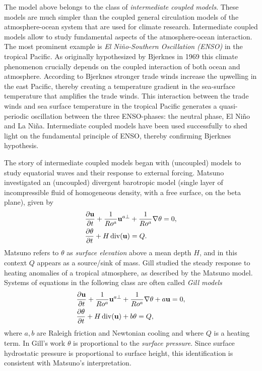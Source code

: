 \documentclass[11pt, oneside]{article}   	%
\numberwithin{equation}{section}
\theoremstyle{plain}
\theoremstyle{definition}
\theoremstyle{remark}
\DeclareMathOperator{\Div}{div}
\newcommand{\<}{\langle}
\renewcommand{\>}{\rangle}
\def\U{{\bf u}}
\begin{document}
The model above belongs to the class of  {\it intermediate coupled models}. These models are much simpler than the coupled general circulation models of the atmosphere-ocean system that are used for climate research. Intermediate coupled models allow to study fundamental aspects of the atmosphere-ocean interaction. The most prominent example is {\it El Ni\~{n}o-Southern Oscillation (ENSO)} in the tropical Pacific. As originally hypothesized by Bjerknes in 1969 \cite{bjerknes1969atmospheric} this climate phenomenon crucially depends on the coupled interaction of both ocean and atmosphere. 
According to Bjerknes stronger trade winds increase the upwelling in the east Pacific, thereby creating a temperature gradient in the sea-surface temperature
that amplifies the trade winds. This interaction between the trade winds and sea surface temperature in the tropical Pacific generates a quasi-periodic oscillation between the three ENSO-phases: the neutral phase, El Ni\~{n}o and La Ni\~{n}a. Intermediate coupled models have been used successfully to shed light on the fundamental principle of ENSO, thereby confirming Bjerknes hypothesis. 

The story of intermediate coupled models began with (uncoupled) models to study equatorial waves and their response to external forcing.
Matsuno \cite{matsuno1966quasi} investigated an (uncoupled) divergent barotropic model (single layer of incompressible fluid of homogeneous density, 
with a free surface, on the beta plane), given by
\begin{equation}\begin{split}\label{MATSUNO}
&\frac{\partial \U}{\partial t}
+\frac{1}{Ro^a}\U^{a\bot}
+\frac{1}{Ro^a}\nabla \theta
=0,\\
&\frac{\partial \theta}{\partial t}
+H\Div(\U)= Q.
\end{split}\end{equation}
Matsuno \cite{matsuno1966quasi} refers to $\theta$ as {\it surface elevation} above a mean depth $H$, and in this context $Q$ appears as a source/sink of mass. Gill \cite{gill1980some} studied the steady response to heating anomalies of a tropical atmosphere, as described by the Matsuno model. Systems of equations in the following class are often called  {\it Gill models}
\begin{equation}\begin{split}\label{GILL}
&\frac{\partial \U}{\partial t}
+\frac{1}{Ro^a}\U^{a\bot}
+\frac{1}{Ro^a}\nabla \theta + a\U
=0,\\
&\frac{\partial \theta}{\partial t}
+H\Div(\U) +b\theta= Q,
\end{split}\end{equation}
where $a,b$ are Raleigh friction and Newtonian cooling and where $Q$ is a heating term. In Gill's work $\theta$ is proportional to the {\it surface pressure}.
Since surface hydrostatic pressure is proportional to surface height, this identification is consistent with Matsuno's interpretation. 
\end{document}
